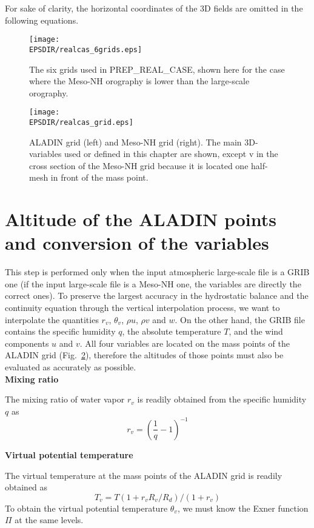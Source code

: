 For sake of clarity, the horizontal coordinates of the 3D fields are omitted
in the following equations.

\begin{figure}[!ht]
\centerline{\texttt{[image: \\EPSDIR/realcas\_6grids.eps]}}
\caption{The six grids used in PREP\_REAL\_CASE, shown here for the case
where the Meso-NH orography is lower than the large-scale orography.
\label{fivegrids}}
\end{figure}

\clearpage

\begin{figure}[!ht]
\centerline{\texttt{[image: \\EPSDIR/realcas\_grid.eps]}}
\caption{ALADIN grid (left) and Meso-NH grid (right).
The main 3D-variables used or defined in this chapter
are shown, except v in the cross section of the Meso-NH grid because it
is located one half-mesh in front of the mass point.
\label{grids}}
\end{figure}
\section{Altitude of the ALADIN points and conversion of the variables}

This step is performed only when the input atmospheric large-scale file
is a GRIB one (if the input large-scale file is a Meso-NH one,
the variables are directly the correct ones). To preserve the largest
accuracy in the hydrostatic balance and the continuity equation through the
vertical interpolation process, we want to interpolate the quantities
$r_v$, $\theta_v$, $\rho u$, $\rho v$ and $w$. On the other hand, the GRIB
file contains the specific humidity $q$, the absolute temperature $T$,
and the wind components $u$ and $v$. All four variables are located on
the mass points of the ALADIN grid (Fig.~\ref{grids}),
therefore the altitudes of
those points must also be evaluated as accurately as possible. \\

{\bf Mixing ratio}

The mixing ratio of water vapor $r_v$ is readily obtained from the specific
humidity $q$ as
\begin{equation}
r_v=\left(\frac{1}{q}-1\right)^{-1}
\end{equation}

{\bf Virtual potential temperature}

The virtual temperature at the mass points of the ALADIN grid is readily obtained
as
\begin{equation}
T_v= T  (1+r_v R_v/R_d)/(1+r_v)
\end{equation}
To obtain the virtual potential temperature $\theta_v$, we must know the
Exner function $\Pi$ at the same levels.

